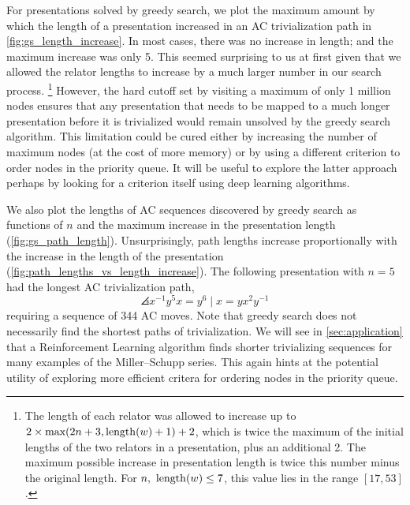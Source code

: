 For presentations solved by greedy search, we plot the maximum amount by which the length of a presentation increased in an AC trivialization path in \autoref{fig:gs_length_increase}. In most cases, there was no increase in length; and the maximum increase was only 5. This seemed surprising to us at first given that we allowed the relator lengths to increase by a much larger number in our search process.
\footnote{The length of each relator was allowed to increase up to \(2 \times \text{max}(2n+3, \operatorname{length}(w)+1) + 2\), which is twice the maximum of the initial lengths of the two relators in a presentation, plus an additional 2.
The maximum possible increase in presentation length is twice this number minus the original length. For $n, \ \operatorname{length}(w) \leq 7$, this value lies in the range $[17, 53]$.
}
However, the hard cutoff set by visiting a maximum of only 1 million nodes ensures that any presentation that needs to be mapped to a much longer presentation before it is trivialized would remain unsolved by the greedy search algorithm. This limitation could be cured either by increasing the number of maximum nodes (at the cost of more memory) or by using a different criterion to order nodes in the priority queue. It will be useful to explore the latter approach perhaps by looking for a criterion itself using deep learning algorithms.
\newline

We also plot the lengths of AC sequences discovered by greedy search as functions of $n$ and the maximum increase in the presentation length (\autoref{fig:gs_path_length}). Unsurprisingly, path lengths increase proportionally with the increase in the length of the presentation (\autoref{fig:path_lengths_vs_length_increase}).
The following presentation with $n=5$ had the longest AC trivialization path,
\[
\angles{x^{-1} y^5 x = y^6 \mid  x = y x^2 y^{-1}}
\]
requiring a sequence of 344 AC moves. Note that greedy search does not necessarily find the shortest paths of trivialization. We will see in \autoref{sec:application} that a Reinforcement Learning algorithm finds shorter trivializing sequences for many examples of the Miller--Schupp series. This again hints at the potential utility of exploring more efficient critera for ordering nodes in the priority queue.

